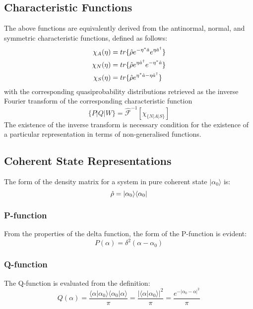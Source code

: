 \subsection{Characteristic Functions}
The above functions are equivalently derived from the antinormal, normal, and symmetric characteristic functions, defined as follows:
\begin{align}
	\chi_{A} (\eta) &= tr\{\hat{\rho} e^{-\eta^* \hat{a}}e^{\eta {\hat{a}^\dagger} } \} \\
	\chi_{N} (\eta) &= tr\{\hat{\rho} e^{\eta {\hat{a}^\dagger}}e^{-\eta^* \hat{a} } \} \\
	\chi_{S} (\eta) &= tr\{\hat{\rho} e^{\eta^* \hat{a}-\eta {\hat{a}^\dagger} } \}
\end{align}
with the corresponding quasiprobability distributions retrieved as the inverse Fourier transform of the corresponding characteristic function
\begin{equation}
 	\{P|Q|W\} = \hat{\mathscr{F}}^{-1} [\chi_{\{N|A|S\}}]
\end{equation}
The existence of the inverse transform is necessary condition for the existence of a particular representation in terms of non-generalised functions.
\subsection{Coherent State Representations}
The form of the density matrix for a system in pure coherent state $ | \alpha_0 \rangle $  is:
\begin{equation}
 	\hat{\rho} = | \alpha_0 \rangle \langle \alpha_0 |
\end{equation}
\subsubsection{P-function}
From the properties of the delta function, the form of the P-function is evident:
\begin{equation}
	P(\alpha) = \delta^2(\alpha-\alpha_0)
\end{equation}
\subsubsection{Q-function}
The Q-function is evaluated from the definition:
\begin{equation}
	Q(\alpha) = \frac{\langle \alpha | \alpha_0 \rangle \langle \alpha_0 | \alpha \rangle}{\pi} = \frac{{|\langle \alpha | \alpha_0 \rangle |}^2}{\pi} =  \frac{e^{-{|\alpha_0 - \alpha |}^2}}{\pi}
\end{equation}
